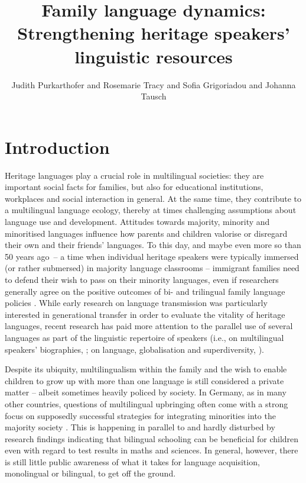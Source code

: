 \documentclass[output=paper,colorlinks,citecolor=brown]{langscibook}
\author{Judith Purkarthofer\orcid{0000-0002-2650-2274}\affiliation{University of Duisburg-Essen} and         Rosemarie Tracy\orcid{0000-0002-6683-3481}\affiliation{University of Mannheim} and         Sofia Grigoriadou\orcid{}\affiliation{University of Duisburg-Essen} and         Johanna Tausch\orcid{0009-0008-1945-3356}\affiliation{University of Mannheim; Leibniz Institute for the German Language}}
\title[Family language dynamics]
      {Family language dynamics: Strengthening heritage speakers’ linguistic resources}
\begin{document}
\maketitle

\section{Introduction}
Heritage languages play a crucial role in multilingual societies: they are important social facts for families, but also for educational institutions, workplaces and social interaction in general. At the same time, they contribute to a multilingual language ecology, thereby at times challenging assumptions about language use and development. Attitudes towards majority, minority and minoritised languages influence how parents and children valorise or disregard their own and their friends’ languages. To this day, and maybe even more so than 50 years ago~– a time when individual heritage speakers were typically immersed (or rather submersed) in majority language classrooms – immigrant families need to defend their wish to pass on their minority languages, even if researchers generally agree on the positive outcomes of bi- and trilingual family language policies \parencite{Schwartz&Verschick2013, Tracy2014, Tracy&al.2018, Arnaus&al.2019}. While early research on language transmission \parencite{Fishman1991} was particularly interested in generational transfer in order to evaluate the vitality of heritage languages, recent research has paid more attention to the parallel use of several languages as part of the linguistic repertoire of speakers (i.e., on multilingual speakers’ biographies, \citealt{Pavlenko&Blackledge2004, Busch2012, Purkarthofer&Flubacher2022}; on language, globalisation and superdiversity, \citealt{Arnaut&al.2016}).

Despite its ubiquity, multilingualism within the family and the wish to enable children to grow up with more than one language is still considered a private matter – albeit sometimes heavily policed by society. In Germany, as in many other countries, questions of multilingual upbringing often come with a strong focus on supposedly successful strategies for integrating minorities into the majority society \parencite{Tracy2014, Schroeder2017, Wiese&al.2020}. This is happening in parallel to and hardly disturbed by research findings indicating that bilingual schooling can be beneficial for children even with regard to test results in maths and sciences. In general, however, there is still little public awareness of what it takes for language acquisition, monolingual or bilingual, to get off the ground.
\end{document}
